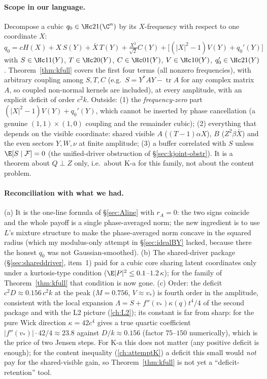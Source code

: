 \paragraph{Scope in our language.} Decompose a cubic $q_0\in\Hc21(\C^n)$ by its $X$-frequency with respect to one coordinate $X$:
$q_0=cH(X)+X\,S(Y)+\bar X\,T(Y)+\frac{X^2}{\sqrt2}C(Y)+\bigl[(|X|^2-1)V(Y)+q_0'(Y)\bigr]$ with $S\in\Hc11(Y)$, $T\in\Hc20(Y)$, $C\in\Hc01(Y)$, $V\in\Hc10(Y)$, $q_0'\in\Hc21(Y)$.
Theorem~\ref{thm:kfull} covers the first four terms (all nonzero frequencies), with arbitrary coupling among $S,T,C$ (e.g.\ $S=Y^*AY-\operatorname{tr}A$ for any complex matrix $A$,
so coupled non-normal kernels are included), at every amplitude, with an explicit deficit of order $c^2k$. Outside: (1) the \emph{frequency-zero} part $(|X|^2-1)V(Y)+q_0'(Y)$, which
cannot be inserted by phase cancellation (a genuine $(1,1)\times(1,0)$ coupling and the remainder cubic); (2) everything that depends on the visible coordinate: shared visible $A$
($(T-1)\alpha X$), $B$ ($Z^2\beta\bar X$) and the even sectors $Y,W,\nu$ at finite amplitude; (3) a buffer correlated with $S$ unless $\E[S\mid\mathcal F]=0$ (the unified-driver
obstruction of \S\ref{sec:kjoint-obstr}). It is a theorem about $Q\perp Z$ only, i.e.\ about K-a for this family, not about the content problem.

\paragraph{Reconciliation with what we had.} (a) It is the one-line formula of \S\ref{sec:Aline} with $r_A=0$: the two signs coincide and the whole payoff is a single phase-averaged
norm; the new ingredient is to use $L$'s mixture structure to make the phase-averaged norm concave in the squared radius (which my modulus-only attempt in \S\ref{sec:idealBY} lacked,
because there the honest $q_0$ was not Gaussian-smoothed). (b) The shared-driver package (\S\ref{sec:shareddriver}, item~1) paid for a cubic core sharing latent coordinates only under
a kurtosis-type condition ($\E|P|^2\le0.1$--$1.2\,\kappa$); for the family of Theorem~\ref{thm:kfull} that condition is now gone. (c) Order: the deficit $c^2D\approx0.156\,c^2k$ at the
peak ($M=0.756$, $V\approx v_*$) is fourth order in the amplitude, consistent with the local expansion $\Lambda=S+f''(v_*)\kappa(q)t^4/4$ of the second package and with the L2 picture
(\autoref{ch:L2}); its constant is far from sharp: for the pure Wick direction $\kappa=42c^4$ gives a true quartic coefficient $|f''(v_*)|\cdot42/4\approx23.8$ against $D/k\approx0.156$
(factor $75$--$150$ numerically), which is the price of two Jensen steps. For K-a this does not matter (any positive deficit is enough); for the content inequality
(\autoref{ch:attemptK}) a deficit this small would \emph{not} pay for the shared-visible gain, so Theorem~\ref{thm:kfull} is not yet a ``deficit-retention'' tool.

